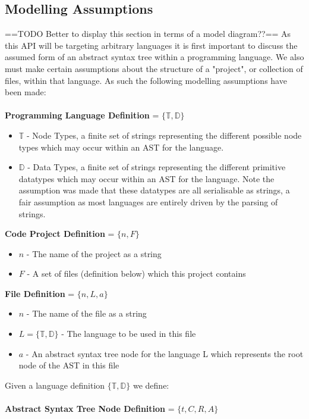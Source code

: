 \documentclass{report}
\begin{document}
\subsection{Modelling Assumptions}
==TODO Better to display this section in terms of a model diagram??==
As this API will be targeting arbitrary languages it is first important to discuss the assumed form of an abstract syntax tree within a programming language. We also must make certain assumptions about the structure of a "project", or collection of files, within that language. As such the following modelling assumptions have been made:
\\
\\
\textbf{Programming Language Definition} = $\{\mathbb{T},\mathbb{D}\}$ 
\begin{itemize}
\item $\mathbb{T}$ - Node Types, a finite set of strings representing the different possible node types which may occur within an AST for the language.
\item $\mathbb{D}$ - Data Types, a finite set of strings representing the different primitive datatypes which may occur within an AST for the language. Note the assumption was made that these datatypes are all serialisable as strings, a fair assumption as most languages are entirely driven by the parsing of strings.
\end{itemize}
%
\textbf{Code Project Definition} = $\{n,F \}$ 
\begin{itemize}
\item $n$ - The name of the project as a string
\item $F$ - A set of files (definition below) which this project contains
\end{itemize}
%
\textbf{File Definition} = $\{n, L, a\}$ 
\begin{itemize}
\item $n$ - The name of the file as a string
\item $L=\{\mathbb{T},\mathbb{D}\}$ - The language to be used in this file
\item $a$ - An abstract syntax tree node for the language L which represents the root node of the AST in this file
\end{itemize}
%
Given a language definition $\{\mathbb{T},\mathbb{D}\}$ we define:\\
\\
\textbf{Abstract Syntax Tree Node Definition} = $\{t,C,R,A\}$ 
\end{document}
